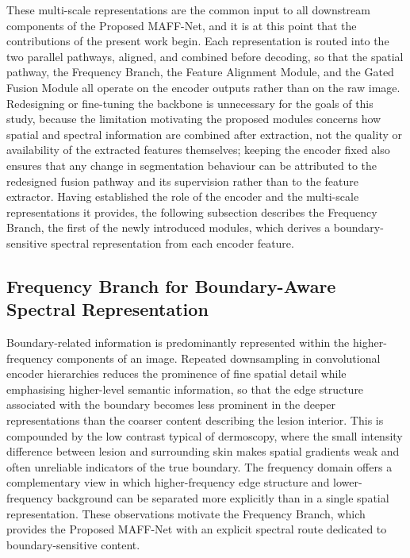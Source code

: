 These multi-scale representations are the common input to all downstream components of the Proposed MAFF-Net, and it is at this point that the contributions of the present work begin. Each representation is routed into the two parallel pathways, aligned, and combined before decoding, so that the spatial pathway, the Frequency Branch, the Feature Alignment Module, and the Gated Fusion Module all operate on the encoder outputs rather than on the raw image. Redesigning or fine-tuning the backbone is unnecessary for the goals of this study, because the limitation motivating the proposed modules concerns how spatial and spectral information are combined after extraction, not the quality or availability of the extracted features themselves; keeping the encoder fixed also ensures that any change in segmentation behaviour can be attributed to the redesigned fusion pathway and its supervision rather than to the feature extractor. Having established the role of the encoder and the multi-scale representations it provides, the following subsection describes the Frequency Branch, the first of the newly introduced modules, which derives a boundary-sensitive spectral representation from each encoder feature.

\subsection{Frequency Branch for Boundary-Aware Spectral Representation}

Boundary-related information is predominantly represented within the higher-frequency components of an image. Repeated downsampling in convolutional encoder hierarchies reduces the prominence of fine spatial detail while emphasising higher-level semantic information, so that the edge structure associated with the boundary becomes less prominent in the deeper representations than the coarser content describing the lesion interior. This is compounded by the low contrast typical of dermoscopy, where the small intensity difference between lesion and surrounding skin makes spatial gradients weak and often unreliable indicators of the true boundary. The frequency domain offers a complementary view in which higher-frequency edge structure and lower-frequency background can be separated more explicitly than in a single spatial representation. These observations motivate the Frequency Branch, which provides the Proposed MAFF-Net with an explicit spectral route dedicated to boundary-sensitive content.

